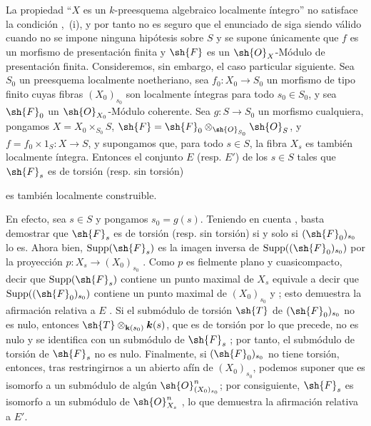 \begin{remark}[9.4.9]
\label{IV.9.4.9}
La propiedad ``$X$ es un $k$-preesquema algebraico localmente íntegro'' no satisface la condición ,~(i), y por tanto no es seguro que el enunciado de  siga siendo válido cuando no se impone ninguna hipótesis sobre $S$ y se supone únicamente que $f$ es un morfismo de presentación finita y $\sh{F}$ es un $\sh{O}_X$-Módulo de presentación finita. Consideremos, sin embargo, el caso particular siguiente. Sea $S_0$ un preesquema localmente noetheriano, sea $f_0:X_0\to S_0$ un morfismo de tipo finito cuyas fibras $(X_0)_{s_0}$ son localmente íntegras para todo $s_0\in S_0$, y sea $\sh{F}_0$ un $\sh{O}_{X_0}$-Módulo coherente. Sea $g:S\to S_0$ un morfismo cualquiera, pongamos
$X=X_0\times_{S_0}S$, $\sh{F}=\sh{F}_0\otimes_{\sh{O}_{S_0}}\sh{O}_S$, y $f=f_0\times 1_S:X\to S$, y supongamos que, para todo $s\in S$, la fibra $X_s$ es también localmente íntegra. Entonces el conjunto $E$ (resp. $E'$) de los $s\in S$ tales que $\sh{F}_s$ es de torsión (resp. sin torsión)


es también localmente construible.

En efecto, sea $s\in S$ y pongamos $s_0=g(s)$. Teniendo en cuenta , basta demostrar que $\sh{F}_s$ es de torsión (resp. sin torsión) si y solo si $(\sh{F}_0)_{s_0}$ lo es. Ahora bien, $\operatorname{Supp}(\sh{F}_s)$ es la imagen inversa de $\operatorname{Supp}((\sh{F}_0)_{s_0})$ por la proyección $p:X_s\to(X_0)_{s_0}$ . Como $p$ es fielmente plano y cuasicompacto, decir que $\operatorname{Supp}(\sh{F}_s)$ contiene un punto maximal de $X_s$ equivale a decir que $\operatorname{Supp}((\sh{F}_0)_{s_0})$ contiene un punto maximal de $(X_0)_{s_0}$  y ; esto demuestra la afirmación relativa a $E$ . Si el submódulo de torsión $\sh{T}$ de $(\sh{F}_0)_{s_0}$ no es nulo, entonces $\sh{T}\otimes_{\mathbf{k}(s_0)}\boldsymbol{k}(s)$, que es de torsión por lo que precede, no es nulo y se identifica con un submódulo de $\sh{F}_s$ ; por tanto, el submódulo de torsión de $\sh{F}_s$ no es nulo. Finalmente, si $(\sh{F}_0)_{s_0}$ no tiene torsión, entonces, tras restringirnos a un abierto afín de $(X_0)_{s_0}$, podemos suponer que es isomorfo a un submódulo de algún $\sh{O}_{(X_0)_{s_0}}^n$; por consiguiente, $\sh{F}_s$ es isomorfo a un submódulo de $\sh{O}_{X_s}^n$ , lo que demuestra la afirmación relativa a $E'$.
\end{remark}

